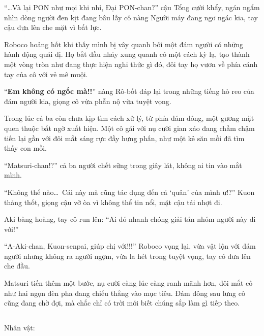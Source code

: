 \documentclass[../main.tex]{subfiles}
\begin{document}
``\dots Và lại PON như mọi khi nhỉ, Đại PON-chan?'' cậu Tổng cười khẩy, ngán ngẩm nhìn dòng người đen kịt đang bâu lấy cô nàng Người máy đang ngơ ngác kia, tay cậu đưa lên che mặt vì bất lực.

Roboco hoảng hốt khi thấy mình bị vây quanh bởi một đám người có những hành động quái dị. Họ bắt đầu nhảy xung quanh cô một cách kỳ lạ, tạo thành một vòng tròn như đang thực hiện nghi thức gì đó, đôi tay họ vươn về phía cánh tay của cô với vẻ mê muội.

``\textbf{Em không có ngốc mà!!}'' nàng Rô-bốt đáp lại trong những tiếng hò reo của đám người kia, giọng cô vừa phẫn nộ vừa tuyệt vọng.

Trong lúc cả ba còn chưa kịp tìm cách xử lý, từ phía đám đông, một gương mặt quen thuộc bất ngờ xuất hiện. Một cô gái với nụ cười gian xảo đang chầm chậm tiến lại gần với đôi mắt sáng rực đầy hưng phấn, như một kẻ săn mồi đã tìm thấy con mồi.


``Matsuri-chan!?'' cả ba người chết sững trong giây lát, không ai tin vào mắt mình.

``Không thể nào\dots\ Cái này mà cũng tác dụng đến cả `quân' của mình ư!?'' Kuon thảng thốt, giọng cậu vỡ òa vì không thể tin nổi, mặt cậu tái nhợt đi.

Aki bàng hoàng, tay cô run lên: ``Ai đó nhanh chóng giải tán nhóm người này đi với!''

``A-Aki-chan, Kuon-senpai, giúp chị với!!!'' Roboco vọng lại, vừa vật lộn với đám người nhưng không ra người ngợm, vừa la hét trong tuyệt vọng, tay cô đưa lên che đầu.

Matsuri tiến thêm một bước, nụ cười càng lúc càng ranh mãnh hơn, đôi mắt cô như hai ngọn đèn pha đang chiếu thẳng vào mục tiêu. Đám đông sau lưng cô cũng đang chờ đợi, mà chắc chỉ có trời mới biết chúng sắp làm gì tiếp theo.

\newpage

\subsection*{\label{ep-S13.VIII}}
\begin{center}
  {\caviar\fontsize{12pt}{12pt}\selectfont Nhân vật:       }
\end{center}
\end{document}
